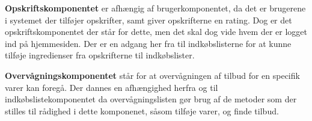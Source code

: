 \textbf{Opskriftskomponentet} er afhængig af brugerkomponentet, da det er brugerene i systemet der tilføjer opskrifter, samt giver opskrifterne en rating. 
Dog er det opskriftskomponentet der står for dette, men det skal dog vide hvem der er logget ind på hjemmesiden. 
Der er en adgang her fra til indkøbslisterne for at kunne tilføje ingredienser fra opskrifterne til indkøbslister.

\textbf{Overvågningskomponentet} står for at overvågningen af tilbud for en specifik varer kan foregå. 
Der dannes en afhængighed herfra og til indkøbslistekomponentet da overvågningslisten gør brug af de metoder som der stilles til rådighed i dette komponenet, såsom tilføje varer, og finde tilbud.


